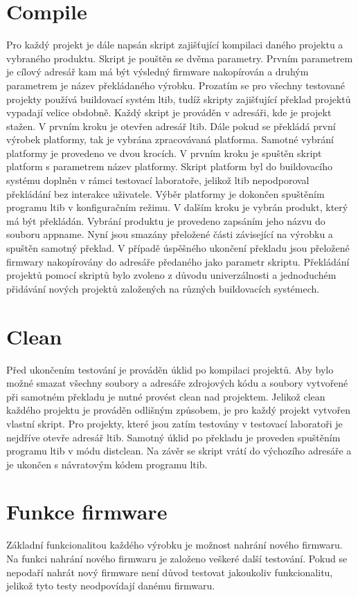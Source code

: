 \section{Compile}
Pro každý projekt je dále napsán skript zajišťující kompilaci daného projektu a vybraného produktu. Skript je pouštěn se dvěma parametry. Prvním parametrem je cílový adresář kam má být výsledný firmware nakopírován a druhým parametrem je název překládaného výrobku. Prozatím se pro všechny testované projekty používá buildovací systém ltib, tudíž skripty zajišťující překlad projektů vypadají velice obdobně. Každý skript je prováděn v adresáři, kde je projekt stažen. V prvním kroku je otevřen adresář ltib. Dále pokud se překládá první výrobek platformy, tak je vybrána zpracovávaná platforma. Samotné vybrání platformy je provedeno ve dvou krocích. V prvním kroku je spuštěn skript platform s parametrem název platformy. Skript platform byl do buildovacího systému doplněn v rámci testovací laboratoře, jelikož ltib nepodporoval překládání bez interakce uživatele. Výběr platformy je dokončen spuštěním programu ltib v konfiguračním režimu. V dalším kroku je vybrán produkt, který má být překládán. Vybrání produktu je provedeno zapsáním jeho názvu do souboru appname. Nyní jsou smazány přeložené části závisející na výrobku a spuštěn samotný překlad. V případě úspěšného ukončení překladu jsou přeložené firmwary nakopírovány do adresáře předaného jako parametr skriptu. Překládání projektů pomocí skriptů bylo zvoleno z důvodu univerzálnosti a jednoduchém přidávání nových projektů založených na různých buildovacích systémech.

\section{Clean}
Před ukončením testování je prováděn úklid po kompilaci projektů. Aby bylo možné smazat všechny soubory a adresáře zdrojových kódu a soubory vytvořené při samotném překladu je nutné provést clean nad projektem. Jelikož clean každého projektu je prováděn odlišným způsobem, je pro každý projekt vytvořen vlastní skript. Pro projekty, které jsou zatím testovány v testovací laboratoři je nejdříve otevře adresář ltib. Samotný úklid po překladu je proveden spuštěním programu ltib v módu distclean. Na závěr se skript vrátí do výchozího adresáře a je ukončen s návratovým kódem programu ltib.

\section{Funkce firmware}
Základní funkcionalitou každého výrobku je možnost nahrání nového firmwaru. Na funkci nahrání nového firmwaru je založeno veškeré další testování. Pokud se nepodaří nahrát nový firmware není důvod testovat jakoukoliv funkcionalitu, jelikož tyto testy neodpovídají danému firmwaru.

